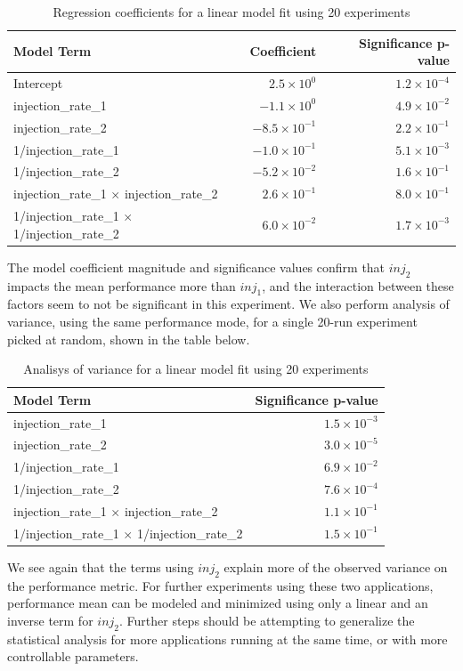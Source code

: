 \documentclass[a4paper]{article}
\begin{document}
\begin{table}[h]
\centering
\caption{Regression coefficients for a linear model fit using 20 experiments}
\begin{tabular}{lrr}
  \toprule
Model Term & Coefficient & Significance p-value \\
  \midrule
Intercept & $2.5 \times 10^{0}$ & $1.2 \times 10^{-4}$ \\
  injection\_rate\_1 & $-1.1 \times 10^{0}$ & $4.9 \times 10^{-2}$ \\
  injection\_rate\_2 & $-8.5 \times 10^{-1}$ & $2.2 \times 10^{-1}$ \\
  1/injection\_rate\_1 & $-1.0 \times 10^{-1}$ & $5.1 \times 10^{-3}$ \\
  1/injection\_rate\_2 & $-5.2 \times 10^{-2}$ & $1.6 \times 10^{-1}$ \\
  injection\_rate\_1 $\times$ injection\_rate\_2 & $2.6 \times 10^{-1}$ & $8.0 \times 10^{-1}$ \\
  1/injection\_rate\_1 $\times$ 1/injection\_rate\_2 & $6.0 \times 10^{-2}$ & $1.7 \times 10^{-3}$ \\
   \bottomrule
\end{tabular}
\end{table}

The  model coefficient  magnitude and  significance values  confirm that  \(inj_2\)
impacts the mean performance more than \(inj_1\), and the interaction between these
factors seem to not be significant  in this experiment. We also perform analysis
of variance,  using the same  performance mode,  for a single  20-run experiment
picked at random, shown in the table below.


\begin{table}[h]
\centering
\caption{Analisys of variance for a linear model fit using 20 experiments}
\begin{tabular}{lr}
  \toprule
Model Term & Significance p-value \\
  \midrule
injection\_rate\_1 & $1.5 \times 10^{-3}$ \\
  injection\_rate\_2 & $3.0 \times 10^{-5}$ \\
  1/injection\_rate\_1 & $6.9 \times 10^{-2}$ \\
  1/injection\_rate\_2 & $7.6 \times 10^{-4}$ \\
  injection\_rate\_1 $\times$ injection\_rate\_2 & $1.1 \times 10^{-1}$ \\
  1/injection\_rate\_1 $\times$ 1/injection\_rate\_2 & $1.5 \times 10^{-1}$ \\
  \bottomrule
\end{tabular}
\end{table}

We see again that  the terms using \(inj_2\) explain more  of the observed variance
on the performance metric. For further experiments using these two applications,
performance mean can be modeled and minimized using only a linear and an inverse
term  for  \(inj_2\).  Further  steps   should  be  attempting  to  generalize  the
statistical analysis  for more applications  running at  the same time,  or with
more controllable parameters.
\end{document}

